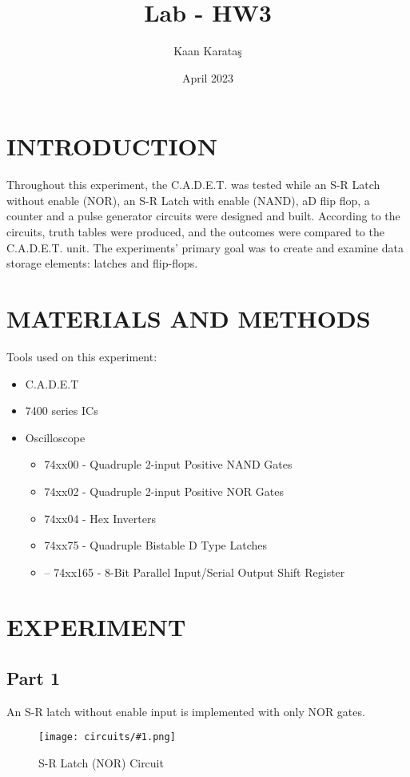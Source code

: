 \documentclass[pdftex,12pt,a4paper]{article}
\title{Lab - HW3}
\author{Kaan Karataş}
\date{April 2023}
\theoremstyle{plain}
\newcommand{\circuit}[1]{
    \begin{figure}[H]
    	\centering
    	\texttt{[image: circuits/\#1.png]}
    	\caption{#1 Circuit}
    	\label{fig7}
    \end{figure}
    \vspace{1cm}
}
\begin{document}


\thispagestyle{empty}


\setcounter{tocdepth}{4}
\tableofcontents
\clearpage
\setcounter{page}{1}
\setcounter{subsubsection}{0}

\section{INTRODUCTION}
Throughout this experiment, the C.A.D.E.T. was tested while an S-R Latch without enable (NOR), an S-R Latch with enable (NAND), aD flip flop, a counter and a pulse generator circuits were designed and built. According to the circuits, truth tables were produced, and the outcomes were compared to the C.A.D.E.T. unit. The experiments’ primary goal was to create and examine data storage elements:
latches and flip-flops.

\section{MATERIALS AND METHODS}
Tools used on this experiment:
\begin{itemize}
    \item C.A.D.E.T
    \item 7400 series ICs
    \item Oscilloscope
    
    \begin{itemize}
        \item 74xx00 - Quadruple 2-input Positive NAND Gates
        \item 74xx02 - Quadruple 2-input Positive NOR Gates
        \item 74xx04 - Hex Inverters
        \item 74xx75 - Quadruple Bistable D Type Latches
        \item – 74xx165 - 8-Bit Parallel Input/Serial Output Shift Register
    \end{itemize}
\end{itemize}
\newpage

\newpage
\section{EXPERIMENT}
    \subsection{Part 1}
        An S-R latch without enable input is implemented with only NOR gates.
        \circuit{S-R Latch (NOR)}
        
\end{document}
